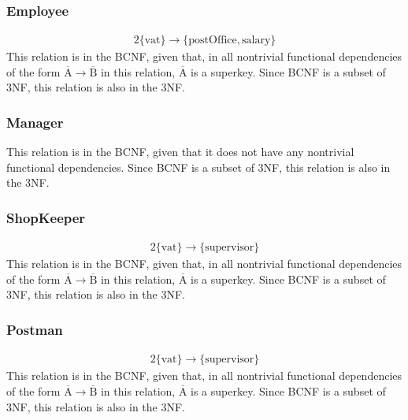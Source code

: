 \documentclass{report}[a4paper]
\theoremstyle{remark}
\begin{document}
\subsubsection{Employee}
\begin{alignat*}{2}
\{\text{vat}\} \rightarrow \{\text{postOffice},\text{salary}\}
\end{alignat*}
This relation is in the BCNF, given that, in all nontrivial functional dependencies of the form $\overline{\text{A}} \rightarrow \overline{\text{B}}$ in this relation, $\overline{\text{A}}$ is a superkey. Since BCNF is a subset of 3NF, this relation is also in the 3NF.
\subsubsection{Manager}
This relation is in the BCNF, given that it does not have any nontrivial functional dependencies. Since BCNF is a subset of 3NF, this relation is also in the 3NF.
\subsubsection{ShopKeeper}
\begin{alignat*}{2}
\{\text{vat}\} \rightarrow \{\text{supervisor}\}
\end{alignat*}
This relation is in the BCNF, given that, in all nontrivial functional dependencies of the form $\overline{\text{A}} \rightarrow \overline{\text{B}}$ in this relation, $\overline{\text{A}}$ is a superkey. Since BCNF is a subset of 3NF, this relation is also in the 3NF.
\subsubsection{Postman}
\begin{alignat*}{2}
\{\text{vat}\} \rightarrow \{\text{supervisor}\}
\end{alignat*}
This relation is in the BCNF, given that, in all nontrivial functional dependencies of the form $\overline{\text{A}} \rightarrow \overline{\text{B}}$ in this relation, $\overline{\text{A}}$ is a superkey. Since BCNF is a subset of 3NF, this relation is also in the 3NF.
\end{document}
